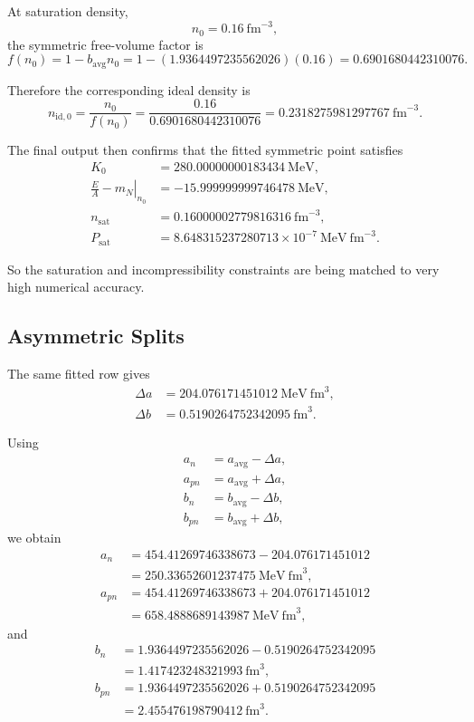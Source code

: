 \documentclass[11pt]{article}
\begin{document}
At saturation density,
\[
n_0=0.16\ \mathrm{fm}^{-3},
\]
the symmetric free-volume factor is
\begin{equation}
f(n_0)=1-b_{\mathrm{avg}}n_0
=
1-(1.9364497235562026)(0.16)
=
0.6901680442310076.
\end{equation}

Therefore the corresponding ideal density is
\begin{equation}
n_{\mathrm{id},0}
=
\frac{n_0}{f(n_0)}
=
\frac{0.16}{0.6901680442310076}
=
0.2318275981297767\ \mathrm{fm}^{-3}.
\end{equation}

The final output then confirms that the fitted symmetric point satisfies
\begin{align}
K_0 &= 280.00000000183434\ \mathrm{MeV}, \\
\left.\frac{E}{A}-m_N\right|_{n_0}
&=
-15.999999999746478\ \mathrm{MeV}, \\
n_{\mathrm{sat}} &= 0.16000002779816316\ \mathrm{fm}^{-3}, \\
P_{\mathrm{sat}} &= 8.648315237280713\times 10^{-7}\ \mathrm{MeV\ fm}^{-3}.
\end{align}

So the saturation and incompressibility constraints are being matched to very
high numerical accuracy.

\subsection{Asymmetric Splits}

The same fitted row gives
\begin{align}
\Delta a &= 204.076171451012\ \mathrm{MeV\ fm}^3, \\
\Delta b &= 0.5190264752342095\ \mathrm{fm}^3.
\end{align}

Using
\begin{align}
a_n &= a_{\mathrm{avg}}-\Delta a, \\
a_{pn} &= a_{\mathrm{avg}}+\Delta a, \\
b_n &= b_{\mathrm{avg}}-\Delta b, \\
b_{pn} &= b_{\mathrm{avg}}+\Delta b,
\end{align}
we obtain
\begin{align}
a_n
&=
454.41269746338673-204.076171451012 \\
&=
250.33652601237475\ \mathrm{MeV\ fm}^3, \\
a_{pn}
&=
454.41269746338673+204.076171451012 \\
&=
658.4888689143987\ \mathrm{MeV\ fm}^3,
\end{align}
and
\begin{align}
b_n
&=
1.9364497235562026-0.5190264752342095 \\
&=
1.417423248321993\ \mathrm{fm}^3, \\
b_{pn}
&=
1.9364497235562026+0.5190264752342095 \\
&=
2.455476198790412\ \mathrm{fm}^3.
\end{align}
\end{document}
